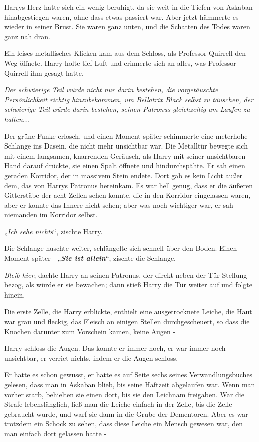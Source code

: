{Harrys Herz hatte sich ein wenig beruhigt, da sie weit in die Tiefen von Askaban hinabgestiegen waren, ohne dass etwas passiert war. Aber jetzt hämmerte es wieder in seiner Brust. Sie waren ganz unten, und die Schatten des Todes waren ganz nah dran.

Ein leises metallisches Klicken kam aus dem Schloss, als Professor Quirrell den Weg öffnete. Harry holte tief Luft und erinnerte sich an alles, was Professor Quirrell ihm gesagt hatte.

\emph{Der schwierige Teil würde nicht nur darin bestehen, die vorgetäuschte Persönlichkeit richtig hinzubekommen, um Bellatrix Black selbst zu täuschen, der schwierige Teil würde darin bestehen, seinen Patronus gleichzeitig am Laufen zu halten...}

Der grüne Funke erlosch, und einen Moment später schimmerte eine meterhohe Schlange ins Dasein, die nicht mehr unsichtbar war. Die Metalltür bewegte sich mit einem langsamen, knarrenden Geräusch, als Harry mit seiner unsichtbaren Hand darauf drückte, sie einen Spalt öffnete und hindurchspähte. Er sah einen geraden Korridor, der in massivem Stein endete. Dort gab es kein Licht außer dem, das von Harrys Patronus hereinkam. Es war hell genug, dass er die äußeren Gitterstäbe der acht Zellen sehen konnte, die in den Korridor eingelassen waren, aber er konnte das Innere nicht sehen; aber was noch wichtiger war, er sah niemanden im Korridor selbst.

„\emph{Ich sehe nichts}“, zischte Harry.

Die Schlange huschte weiter, schlängelte sich schnell über den Boden. Einen Moment später - „\textbf{\emph{Sie ist allein}}“, zischte die Schlange.

\emph{Bleib hier}, dachte Harry an seinen Patronus, der direkt neben der Tür Stellung bezog, als würde er sie bewachen; dann stieß Harry die Tür weiter auf und folgte hinein.

Die erste Zelle, die Harry erblickte, enthielt eine ausgetrocknete Leiche, die Haut war grau und fleckig, das Fleisch an einigen Stellen durchgescheuert, so dass die Knochen darunter zum Vorschein kamen, keine Augen -

Harry schloss die Augen. Das konnte er immer noch, er war immer noch unsichtbar, er verriet nichts, indem er die Augen schloss.

Er hatte es schon gewusst, er hatte es auf Seite sechs seines Verwandlungsbuches gelesen, dass man in Askaban blieb, bis seine Haftzeit abgelaufen war. Wenn man vorher starb, behielten sie einen dort, bis sie den Leichnam freigaben. War die Strafe lebenslänglich, ließ man die Leiche einfach in der Zelle, bis die Zelle gebraucht wurde, und warf sie dann in die Grube der Dementoren. Aber es war trotzdem ein Schock zu sehen, dass diese Leiche ein Mensch gewesen war, den man einfach dort gelassen hatte -

}
